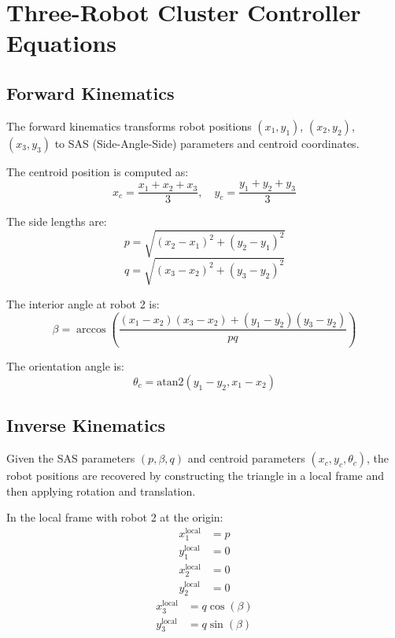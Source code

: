 \documentclass[lettersize,journal]{IEEEtran}
\begin{document}
\section{Three-Robot Cluster Controller Equations}

\subsection{Forward Kinematics}

The forward kinematics transforms robot positions $(x_1, y_1)$, $(x_2, y_2)$, $(x_3, y_3)$ to SAS (Side-Angle-Side) parameters and centroid coordinates.

The centroid position is computed as:
\begin{equation}
x_c = \frac{x_1 + x_2 + x_3}{3}, \quad y_c = \frac{y_1 + y_2 + y_3}{3}
\end{equation}

The side lengths are:
\begin{equation}
p = \sqrt{(x_2 - x_1)^2 + (y_2 - y_1)^2}
\end{equation}
\begin{equation}
q = \sqrt{(x_3 - x_2)^2 + (y_3 - y_2)^2}
\end{equation}

The interior angle at robot 2 is:
\begin{equation}
\beta = \arccos\left(\frac{(x_1 - x_2)(x_3 - x_2) + (y_1 - y_2)(y_3 - y_2)}{pq}\right)
\end{equation}

The orientation angle is:
\begin{equation}
\theta_c = \text{atan2}(y_1 - y_2, x_1 - x_2)
\end{equation}

\subsection{Inverse Kinematics}

Given the SAS parameters $(p, \beta, q)$ and centroid parameters $(x_c, y_c, \theta_c)$, the robot positions are recovered by constructing the triangle in a local frame and then applying rotation and translation.

In the local frame with robot 2 at the origin:
\begin{equation}
\begin{aligned}
x_1^{\text{local}} &= p \\
y_1^{\text{local}} &= 0
\end{aligned}
\end{equation}
\begin{equation}
\begin{aligned}
x_2^{\text{local}} &= 0 \\
y_2^{\text{local}} &= 0
\end{aligned}
\end{equation}
\begin{equation}
\begin{aligned}
x_3^{\text{local}} &= q\cos(\beta) \\
y_3^{\text{local}} &= q\sin(\beta)
\end{aligned}
\end{equation}
\end{document}
